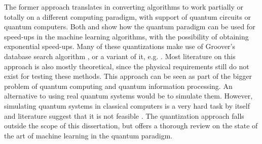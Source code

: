 The former approach translates in converting algorithms to work partially or totally on a different computing paradigm, with support of quantum circuits or quantum computers.
Both \citet{Aimeur2013} and \citet{Lloyd2013} show how the quantum paradigm can be used for speed-ups in the machine learning algorithms, with the possibility of obtaining exponential speed-ups.
Many of these quantizations make use of Groover's database search algorithm \cite{grover1996fast}, or a variant of it, e.g. \citet{Wiebe2014}.
Most literature on this approach is also mostly theoretical, since the physical requirements still do not exist for testing these methods.
This approach can be seen as part of the bigger problem of quantum computing and quantum information processing.
An alternative to using real quantum systems would be to simulate them.
However, simulating quantum systems in classical computers is a very hard task by itself and literature suggest that it is not feasible \cite{Feynman1982}.
The quantization approach falls outside the scope of this dissertation, but \citet{wittek2014quantum} offers a thorough review on the state of the art of machine learning in the quantum paradigm.

